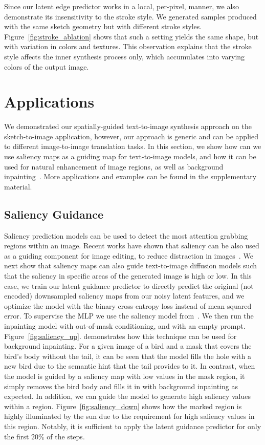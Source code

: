Since our latent edge predictor works in a local, per-pixel, manner, we also demonstrate its insensitivity to the stroke style. We generated samples produced with the same sketch geometry but with different stroke styles.  Figure~\ref{fig:stroke_ablation} shows that such a setting yields the same shape, but with variation in colors and textures. This observation explains that the stroke style affects the inner synthesis process only, which accumulates into varying colors of the output image. 

\section{Applications}
We demonstrated our spatially-guided text-to-image synthesis approach on the sketch-to-image application, however, our approach is generic and can be applied to different image-to-image translation tasks. In this section, we show how  can we use saliency maps as a guiding map for text-to-image models, and how it can be used for natural enhancement of image regions, as well as background inpainting~\cite{kim2022zoom}. More applications and examples can be found in the supplementary material.

\subsection{Saliency Guidance} Saliency prediction models can be used to detect the most attention grabbing regions within an image. Recent works have shown that saliency can be also used as a guiding component for image editing, to reduce distraction in images~\cite{aberman2022deep}. We next show that saliency maps can also guide text-to-image diffusion models such that the saliency in specific areas of the generated image is high or low. In this case, we train our latent guidance predictor to directly predict the original (not encoded) downsampled saliency maps from our noisy latent features, and we optimize the model with the binary cross-entropy loss instead of mean squared error. To supervise the MLP we use the saliency model from~\cite{U2Net}. We then run the inpainting model with out-of-mask conditioning, and with an empty prompt. Figure~\ref{fig:saliency_up}. demonstrates how this technique can be used for background inpainting. For a given image of a bird and a mask that covers the bird's body without the tail, it can be seen that the model fills the hole with a new bird due to the semantic hint that the tail provides to it. In contrast, when the model is guided by a saliency map with low values in the mask region, it simply removes the bird body and fills it in with background inpainting as expected. In addition, we can guide the model to generate high saliency values within a region. Figure~\ref{fig:saliency_down} shows how the marked region is highly illuminated by the sun due to the requirement for high saliency values in this region. Notably, it is sufficient to apply the latent guidance predictor for only the first $20\%$ of the steps.

